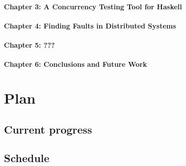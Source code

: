 \documentclass{article}
\begin{document}
\paragraph{Chapter 3: A Concurrency Testing Tool for Haskell}

\paragraph{Chapter 4: Finding Faults in Distributed Systems}

\paragraph{Chapter 5: ???}

\paragraph{Chapter 6: Conclusions and Future Work}

\section{Plan}

\subsection{Current progress}

\subsection{Schedule}



\end{document}
